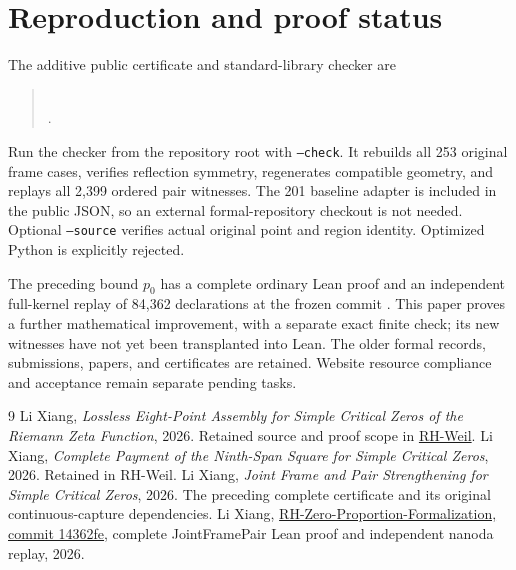 \documentclass[11pt]{article}
\begin{document}
\section{Reproduction and proof status}
The additive public certificate and standard-library checker are
\begin{quote}\small
{}\\
.
\end{quote}
Run the checker from the repository root with \texttt{--check}.
It rebuilds all 253 original frame cases, verifies reflection
symmetry, regenerates compatible geometry, and replays all 2,399
ordered pair witnesses. The 201 baseline adapter is included in
the public JSON, so an external formal-repository checkout is not
needed. Optional \texttt{--source} verifies actual original point
and region identity. Optimized Python is explicitly rejected.

The preceding bound $p_0$ has a complete ordinary Lean proof and
an independent full-kernel replay of 84,362 declarations at the
frozen commit \cite{Formal}. This paper proves a further
mathematical improvement, with a separate exact finite check;
its new witnesses have not yet been transplanted into Lean.
The older formal records, submissions, papers, and certificates
are retained. Website resource compliance and acceptance remain
separate pending tasks.

\begin{thebibliography}{9}
 Li Xiang, \emph{Lossless Eight-Point Assembly for
Simple Critical Zeros of the Riemann Zeta Function}, 2026.
Retained source and proof scope in
\href{https://github.com/lixiang90/RH-Weil}{RH-Weil}.
 Li Xiang, \emph{Complete Payment of the Ninth-Span
Square for Simple Critical Zeros}, 2026. Retained in RH-Weil.
 Li Xiang, \emph{Joint Frame and Pair Strengthening
for Simple Critical Zeros}, 2026. The preceding complete
certificate and its original continuous-capture dependencies.
 Li Xiang,
\href{https://github.com/lixiang90/RH-Zero-Proportion-Formalization/tree/14362fe21fa871a1a951597c573d1601f4755676}{RH-Zero-Proportion-Formalization, commit 14362fe},
complete JointFramePair Lean proof and independent nanoda replay, 2026.
\end{thebibliography}
\end{document}

